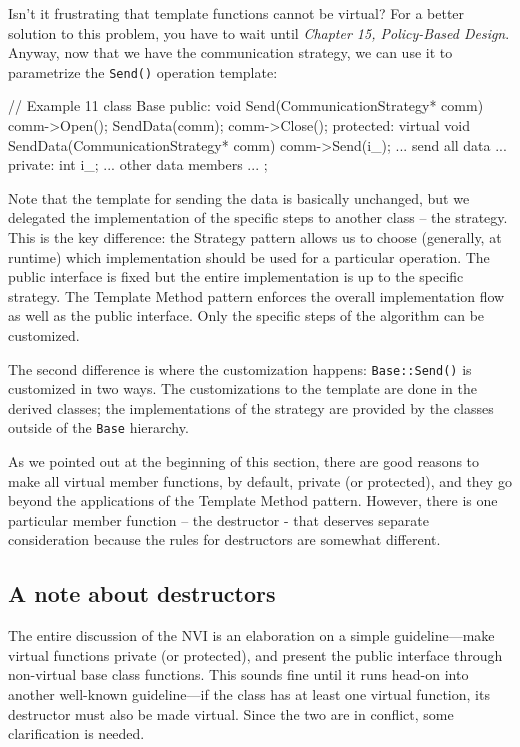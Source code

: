 Isn't it frustrating that template functions cannot be virtual? For a better solution to this problem, you have to wait until \emph{Chapter 15, Policy-Based Design}. Anyway, now that we have the communication strategy, we can use it to parametrize the \texttt{Send()} operation template:

\begin{code}
// Example 11
class Base {
  public:
  void Send(CommunicationStrategy* comm) {
    comm->Open();
    SendData(comm);
    comm->Close();
  }
  protected:
  virtual void SendData(CommunicationStrategy* comm) {
    comm->Send(i_);
    ... send all data ...
  }
  private:
  int i_;
  ... other data members ...
};
\end{code}

Note that the template for sending the data is basically unchanged, but we delegated the implementation of the specific steps to another class -- the strategy. This is the key difference: the Strategy pattern allows us to choose (generally, at runtime) which implementation should be used for a particular operation. The public interface is fixed but the entire implementation is up to the specific strategy. The Template Method pattern enforces the overall implementation flow as well as the public interface. Only the specific steps of the algorithm can be customized.

The second difference is where the customization happens: \texttt{Base::Send()} is customized in two ways. The customizations to the template are done in the derived classes; the implementations of the strategy are provided by the classes outside of the \texttt{Base} hierarchy.

As we pointed out at the beginning of this section, there are good reasons to make all virtual member functions, by default, private (or protected), and they go beyond the applications of the Template Method pattern. However, there is one particular member function -- the destructor - that deserves separate consideration because the rules for destructors are somewhat different.

\subsection{A note about destructors}

The entire discussion of the NVI is an elaboration on a simple guideline---make virtual functions private (or protected), and present the public interface through non-virtual base class functions. This sounds fine until it runs head-on into another well-known guideline---if the class has at least one virtual function, its destructor must also be made virtual. Since the two are in conflict, some clarification is needed.

